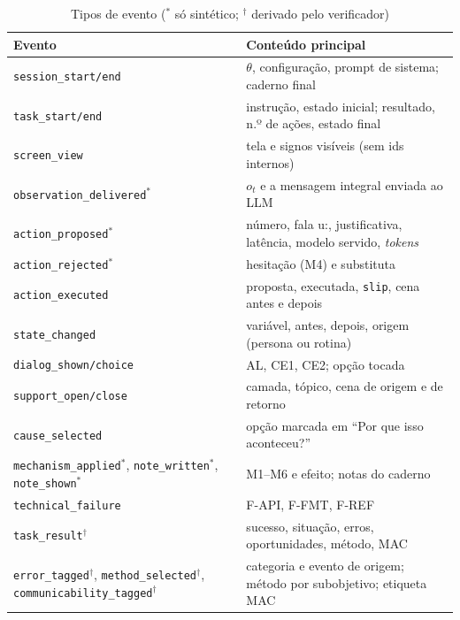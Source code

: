 \documentclass[conference]{IEEEtran}
\newcommand{\ev}[1]{\texttt{#1}}
\begin{document}
\begin{table}[!t]
\caption{Tipos de evento ($^*$ só sintético; $^\dagger$ derivado pelo verificador)}
\label{tab:eventos}
\centering
\scriptsize
\setlength{\tabcolsep}{2.5pt}
\begin{tabularx}{\columnwidth}{@{}>{\raggedright\arraybackslash{}}p{3.15cm}Y@{}}
\toprule
\textbf{Evento} & \textbf{Conteúdo principal} \\
\midrule
\ev{session\_start/end} & $\theta$, configuração, prompt de sistema; caderno final \\
\ev{task\_start/end} & instrução, estado inicial; resultado, n.º de ações, estado final \\
\ev{screen\_view} & tela e signos visíveis (sem ids internos) \\
\ev{observation\_delivered}$^*$ & $o_t$ e a mensagem integral enviada ao LLM \\
\ev{action\_proposed}$^*$ & número, fala u:, justificativa, latência, modelo servido, \textit{tokens} \\
\ev{action\_rejected}$^*$ & hesitação (M4) e substituta \\
\ev{action\_executed} & proposta, executada, \texttt{slip}, cena antes e depois \\
\ev{state\_changed} & variável, antes, depois, origem (persona ou rotina) \\
\ev{dialog\_shown/choice} & AL, CE1, CE2; opção tocada \\
\ev{support\_open/close} & camada, tópico, cena de origem e de retorno \\
\ev{cause\_selected} & opção marcada em ``Por que isso aconteceu?'' \\
\ev{mechanism\_applied}$^*$, \ev{note\_written}$^*$, \ev{note\_shown}$^*$ & M1--M6 e efeito; notas do caderno \\
\ev{technical\_failure} & F-API, F-FMT, F-REF \\
\ev{task\_result}$^\dagger$ & sucesso, situação, erros, oportunidades, método, MAC \\
\ev{error\_tagged}$^\dagger$, \ev{method\_selected}$^\dagger$, \ev{communicability\_}\ev{tagged}$^\dagger$ & categoria e evento de origem; método por subobjetivo; etiqueta MAC \\
\bottomrule
\end{tabularx}
\end{table}
\end{document}
